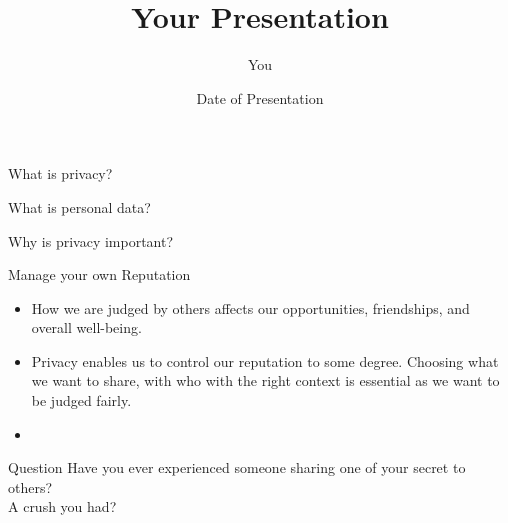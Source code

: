 \documentclass{beamer}
\title[Your Short Title]{Your Presentation}
\author{You}
\institute{Where You're From}
\date{Date of Presentation}
\begin{document}
\begin{frame}
  \titlepage
\end{frame}




%



\begin{frame}{What is privacy?}

\end{frame}

\begin{frame}{What is personal data?}

\end{frame}

\begin{frame}{Why is privacy important?}

\end{frame}


\begin{frame}{Manage your own Reputation}
\begin{itemize}
  \item How we are judged by others affects our opportunities, friendships, and overall well-being.
  \item Privacy enables us to control our reputation to some degree. Choosing what we want to share, with who with the right context is essential as we want to be judged fairly.
  \item
\end{itemize}
\begin{block}{Question}
Have you ever experienced someone sharing one of your secret to others? \\
A crush you had?
\end{block}
\end{frame}
\end{document}
